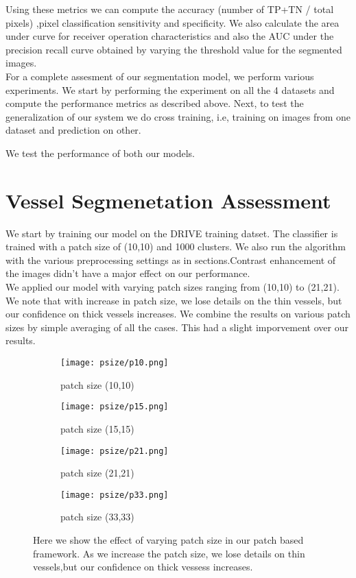 Using these metrics we can compute the accuracy (number of TP+TN / total pixels) ,pixel classification sensitivity and specificity.
We also calculate the area under curve for receiver operation characteristics and also the AUC under the precision recall curve obtained by varying the threshold value for the segmented images.\\

For a complete assesment of our segmentation model, we perform various experiments. We start by performing the experiment on all the 4 datasets and compute the performance metrics as described above. Next, to test the generalization of our system we do cross training, i.e, training on images from one dataset and prediction on other.

We test the performance of both our models.  	

\section{Vessel Segmenetation Assessment}
We start by training our model on the DRIVE training datset. The classifier is trained with a patch size of (10,10) and 1000 clusters. We also run the algorithm with the various preprocessing settings as in sections.Contrast enhancement of the images didn't have a major effect on our performance.\\

We applied our model with varying patch sizes ranging from (10,10) to (21,21). We note that with increase in patch size, we lose details on the thin vessels, but our confidence on thick vessels increases. We combine the results on various patch sizes by simple averaging of all the cases. This had a slight imporvement over our results.

\begin{figure}
	\begin{subfigure}[b]{0.45\textwidth}
		\texttt{[image: psize/p10.png]}
		\caption{patch size (10,10)}
		\label{fig:p10}
	\end{subfigure}
	\begin{subfigure}[b]{0.45\textwidth}
		\texttt{[image: psize/p15.png]}
		\caption{patch size (15,15)}
		\label{fig:p15}
	\end{subfigure}
	
	\begin{subfigure}[b]{0.45\textwidth}
		\texttt{[image: psize/p21.png]}
		\caption{patch size (21,21)}
		\label{fig:p21}
	\end{subfigure}
	\begin{subfigure}[b]{0.45\textwidth}
		\texttt{[image: psize/p33.png]}
		\caption{patch size (33,33)}
		\label{fig:33}
	\end{subfigure}
	\caption[Image segmentation using varying patch sizes]{Here we show the effect of varying patch size in our patch based framework. As we increase the patch size, we lose details on thin vessels,but our confidence on thick vessess increases.}
	\label{fig:patch size}
\end{figure}

